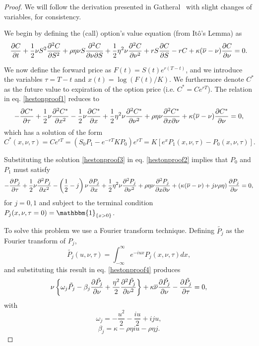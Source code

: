 \begin{proof}
We will follow the derivation presented in Gatheral~\cite{gatheral} with slight changes of variables, for consistency.

We begin by defining the (call) option's value equation (from Itô's Lemma) as
\begin{equation}\label{hestonproof1}
\pdv{C}{t}+\frac{1}{2}\nu S^2\pdv[2]{C}{S}+\rho\eta\nu S\pdv{C}{\nu}{S}+\frac{1}{2}\eta^2\nu\pdv[2]{C}{\nu}+rS\pdv{C}{S}-rC+\kappa(\overline{\nu}-\nu)\pdv{C}{\nu}=0.
\end{equation}

We now define the forward price as $F(t)=S(t)e^{r(T-t)}$, and we introduce the variables $\tau=T-t$ and $x(t)=\log\left(F(t)/K\right)$. We furthermore denote $C^*$ as the future value to expiration of the option price (i.e. $C^*=Ce^{rT}$). The relation in eq. \eqref{hestonproof1} reduces to
\begin{equation}\label{hestonproof2}
-\pdv{C^*}{\tau}+\frac{1}{2}\nu\pdv[2]{C^*}{x}-\frac{1}{2}\nu\pdv{C^*}{x}+\frac{1}{2}\eta^2\nu\pdv[2]{C^*}{\nu}+\rho\eta\nu\pdv{C^*}{x}{\nu}+\kappa(\overline{\nu}-\nu)\pdv{C^*}{\nu}=0,
\end{equation}
\noindent which has a solution of the form \cite{duffie}
\begin{equation}\label{hestonproof3}
C^*(x,\nu,\tau)=Ce^{rT}=\left(S_0P_1-e^{-rT}KP_0\right)e^{rT}=K\left[e^xP_1(x,\nu,\tau)-P_0(x,\nu,\tau)\right].
\end{equation}


Substituting the solution \eqref{hestonproof3} in eq. \eqref{hestonproof2} implies that $P_0$ and $P_1$ must satisfy
\begin{equation}\label{hestonproof4}
-\pdv{P_j}{\tau}+\frac{1}{2}\nu\pdv[2]{P_j}{x}-\left(\frac{1}{2}-j\right)\nu\pdv{P_j}{x}+\frac{1}{2}\eta^2\nu\pdv[2]{P_j}{\nu}+\rho\eta\nu\pdv{P_j}{x}{\nu}+\left(\kappa(\overline{\nu}-\nu)+j\nu\rho\eta\right)\pdv{P_j}{\nu}=0,
\end{equation}
\noindent for $j=0,1$ and subject to the terminal condition $P_j(x,\nu,\tau=0)=\mathbbm{1}_{\left\{x>0\right\}}$.


To solve this problem we use a Fourier transform technique. Defining $\tilde{P_j}$ as the Fourier transform of $P_j$,
\begin{equation}
\tilde{P_j}(u,\nu,\tau)=\int_{-\infty}^{\infty}e^{-iux}P_j(x,\nu,\tau)dx,
\end{equation}
\noindent and substituting this result in eq. \eqref{hestonproof4} produces
\begin{equation}\label{hestonproof5}
\nu\left\{\omega_j\tilde{P_j}-\beta_j\pdv{\tilde{P_j}}{\nu}+\frac{\eta^2}{2}\pdv[2]{\tilde{P_j}}{\nu}\right\}+\kappa\overline{\nu}\pdv{\tilde{P_j}}{\nu}-\pdv{\tilde{P_j}}{\tau}=0,
\end{equation}
\noindent with
\begin{equation}
\omega_j=-\frac{u^2}{2}-\frac{iu}{2}+iju,
\end{equation}
\begin{equation}
\beta_j=\kappa-\rho\eta iu-\rho\eta j.
\end{equation}



\end{proof}

